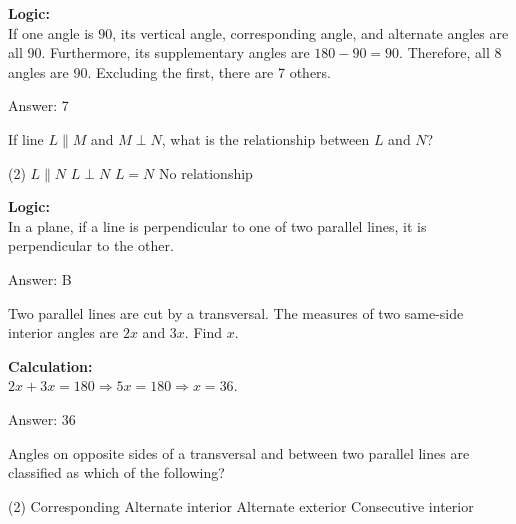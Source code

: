 \documentclass[11pt,paper=a4,answers]{exam}
\begin{document}
\begin{questions}
\begin{solution}
\textbf{Logic:} \\
If one angle is $90$, its vertical angle, corresponding angle, and alternate angles are all 90. Furthermore, its supplementary angles are $180 - 90 = 90$. Therefore, all 8 angles are 90. Excluding the first, there are 7 others.

\vspace{30pt}

Answer: \colorbox{yellow!100}{7}
\end{solution}

\vspace{60pt}

\question
If line $L \parallel M$ and $M \perp N$, what is the relationship between $L$ and $N$?
\begin{tasks}(2)
    \task $L \parallel N$
    \task $L \perp N$
    \task $L = N$
    \task No relationship
\end{tasks}

\begin{solution}
\textbf{Logic:} \\
In a plane, if a line is perpendicular to one of two parallel lines, it is perpendicular to the other.

\vspace{30pt}

Answer: \colorbox{yellow!100}{B}
\end{solution}

\vspace{60pt}

\question
Two parallel lines are cut by a transversal. The measures of two same-side interior angles are $2x$ and $3x$. Find $x$.

\begin{solution}
\textbf{Calculation:} \\
$2x + 3x = 180 \Rightarrow 5x = 180 \Rightarrow x = 36$.

\vspace{30pt}

Answer: \colorbox{yellow!100}{36}
\end{solution}

\vspace{60pt}

\question
Angles on opposite sides of a transversal and between two parallel lines are classified as which of the following?
\begin{tasks}(2)
    \task Corresponding
    \task Alternate interior
    \task Alternate exterior
    \task Consecutive interior
\end{tasks}


\end{questions}
\end{document}
